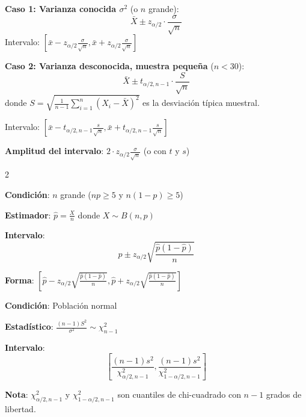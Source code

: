 \documentclass[10pt,a4paper]{article}
\begin{document}
\begin{tcolorbox}[title=Intervalo de Confianza para la Media $\mu$]
    \textbf{Caso 1: Varianza conocida $\sigma^2$} (o $n$ grande):
    \[
        \bar{X} \pm z_{\alpha/2} \cdot \frac{\sigma}{\sqrt{n}}
    \]
    Intervalo: $\left[\bar{x} - z_{\alpha/2} \frac{\sigma}{\sqrt{n}}, \bar{x} + z_{\alpha/2} \frac{\sigma}{\sqrt{n}}\right]$
    
    \textbf{Caso 2: Varianza desconocida, muestra pequeña} ($n < 30$):
    \[
        \bar{X} \pm t_{\alpha/2, n-1} \cdot \frac{S}{\sqrt{n}}
    \]
    donde $S = \sqrt{\frac{1}{n-1}\sum_{i=1}^n (X_i - \bar{X})^2}$ es la desviación típica muestral.
    
    Intervalo: $\left[\bar{x} - t_{\alpha/2, n-1} \frac{s}{\sqrt{n}}, \bar{x} + t_{\alpha/2, n-1} \frac{s}{\sqrt{n}}\right]$
    
    \textbf{Amplitud del intervalo}: $2 \cdot z_{\alpha/2} \frac{\sigma}{\sqrt{n}}$ (o con $t$ y $s$)
\end{tcolorbox}

\begin{multicols}{2}
    \begin{tcolorbox}[title=I.C. para Proporción $p$, equal height group=IC2]
        \textbf{Condición}: $n$ grande ($np \geq 5$ y $n(1-p) \geq 5$)
        
        \textbf{Estimador}: $\hat{p} = \frac{X}{n}$ donde $X \sim B(n, p)$
        
        \textbf{Intervalo}:
        \[
            \hat{p} \pm z_{\alpha/2} \sqrt{\frac{\hat{p}(1-\hat{p})}{n}}
        \]
        
        \textbf{Forma}: $\left[\hat{p} - z_{\alpha/2} \sqrt{\frac{\hat{p}(1-\hat{p})}{n}}, \hat{p} + z_{\alpha/2} \sqrt{\frac{\hat{p}(1-\hat{p})}{n}}\right]$
    \end{tcolorbox}
    \begin{tcolorbox}[title=I.C. para Varianza $\sigma^2$, equal height group=IC2]
        \textbf{Condición}: Población normal
        
        \textbf{Estadístico}: $\frac{(n-1)S^2}{\sigma^2} \sim \chi^2_{n-1}$
        
        \textbf{Intervalo}:
        \[
            \left[\frac{(n-1)s^2}{\chi^2_{\alpha/2, n-1}}, \frac{(n-1)s^2}{\chi^2_{1-\alpha/2, n-1}}\right]
        \]
        
        \textbf{Nota}: $\chi^2_{\alpha/2, n-1}$ y $\chi^2_{1-\alpha/2, n-1}$ son cuantiles de chi-cuadrado con $n-1$ grados de libertad.
    \end{tcolorbox}
\end{multicols}
\end{document}
